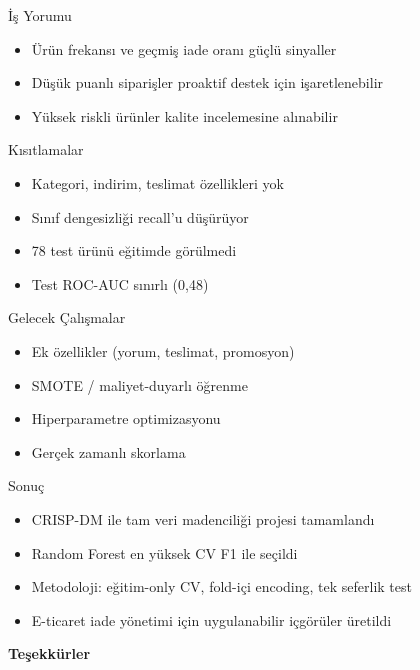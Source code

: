 \documentclass[aspectratio=169,12pt]{beamer}
\begin{document}
\begin{frame}{İş Yorumu}
    \begin{itemize}
        \item Ürün frekansı ve geçmiş iade oranı güçlü sinyaller
        \item Düşük puanlı siparişler proaktif destek için işaretlenebilir
        \item Yüksek riskli ürünler kalite incelemesine alınabilir
    \end{itemize}
\end{frame}

\begin{frame}{Kısıtlamalar}
    \begin{itemize}
        \item Kategori, indirim, teslimat özellikleri yok
        \item Sınıf dengesizliği recall'u düşürüyor
        \item 78 test ürünü eğitimde görülmedi
        \item Test ROC-AUC sınırlı (0,48)
    \end{itemize}
\end{frame}

\begin{frame}{Gelecek Çalışmalar}
    \begin{itemize}
        \item Ek özellikler (yorum, teslimat, promosyon)
        \item SMOTE / maliyet-duyarlı öğrenme
        \item Hiperparametre optimizasyonu
        \item Gerçek zamanlı skorlama
    \end{itemize}
\end{frame}

\begin{frame}{Sonuç}
    \begin{itemize}
        \item CRISP-DM ile tam veri madenciliği projesi tamamlandı
        \item Random Forest en yüksek CV F1 ile seçildi
        \item Metodoloji: eğitim-only CV, fold-içi encoding, tek seferlik test
        \item E-ticaret iade yönetimi için uygulanabilir içgörüler üretildi
    \end{itemize}
    \vspace{0.5cm}
    \centering
    \textbf{Teşekkürler}
\end{frame}
\end{document}
